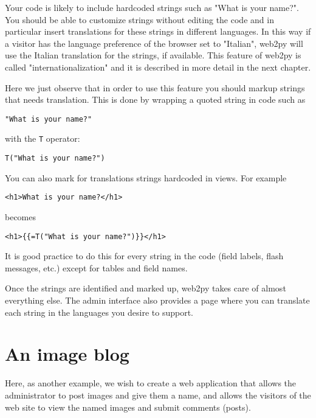 \documentclass[justified,sixbynine,notoc]{tufte-book}
\def\ft{\small\tt}
\def\inxx#1{\index{#1}}
\begin{document}
\begin{fullwidth}
Your code is likely to include hardcoded strings such as "What is your name?". You should be able to customize strings without editing the code and in particular insert translations for these strings in different languages. In this way if a visitor has the language preference of the browser set to "Italian", web2py will use the Italian translation for the strings, if available. This feature of web2py is called "internationalization" and it is described in more detail in the next chapter.

Here we just observe that in order to use this feature you should markup strings that needs translation. This is done by wrapping a quoted string in code such as

\begin{lstlisting}
"What is your name?"
\end{lstlisting}
\noindent with the {\ft T} operator:

\begin{lstlisting}
T("What is your name?")
\end{lstlisting}

You can also mark for translations strings hardcoded in views. For example

\begin{lstlisting}[keywords={}]
<h1>What is your name?</h1>
\end{lstlisting}
\noindent becomes

\begin{lstlisting}[keywords={}]
<h1>{{=T("What is your name?")}}</h1>
\end{lstlisting}

It is good practice to do this for every string in the code (field labels, flash messages, etc.) except for tables and field names.

Once the strings are identified and marked up, web2py takes care of almost everything else. The admin interface also provides a page where you can translate each string in the languages you desire to support.

\goodbreak\section{An image blog}

\inxx{upload}

Here, as another example, we wish to create a web application that allows the administrator to post images and give them a name, and allows the visitors of the web site to view the named images and submit comments (posts).


\end{fullwidth}
\end{document}

